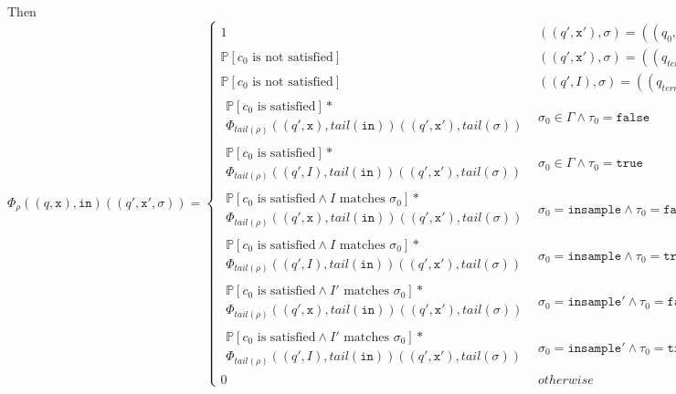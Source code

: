 \documentclass[12pt]{article}
\newcommand{\PP}{\mathbb{P}}
\theoremstyle{definition}
\begin{document}
Then \[
    \Phi_{\rho}((q, \texttt{x}), \texttt{in})((q', \texttt{x}', \sigma)) = \begin{cases}
        1 & ((q', \texttt{x}'), \sigma)=((q_0, \texttt{x}), \lambda)\land n = 0\\
        \PP[c_0\text{ is not satisfied}] & ((q', \texttt{x}'), \sigma) = ((q_{term}, \texttt{x}), \lambda)\land \tau_0 = \texttt{false} \\
        \PP[c_0\text{ is not satisfied}] & ((q', I), \sigma) = ((q_{term}, \texttt{x}), \lambda)\land \tau_0 = \texttt{true}\\
        \begin{gathered}
            \PP[c_0\text{ is satisfied}]*\\
            \Phi_{tail(\rho)}((q',\texttt{x}), tail(\texttt{in}))((q', \texttt{x}'), tail(\sigma))
        \end{gathered} & \sigma_0 \in \Gamma\land \tau_0 = \texttt{false}\\[15pt]
        \begin{gathered}
            \PP[c_0\text{ is satisfied}]*\\
            \Phi_{tail(\rho)}((q',I), tail(\texttt{in}))((q', \texttt{x}'), tail(\sigma))
        \end{gathered} & \sigma_0 \in \Gamma\land\tau_0 = \texttt{true}\\[15pt]
        \begin{gathered}
            \PP[c_0\text{ is satisfied}\land I \text{ matches }\sigma_0]*\\
            \Phi_{tail(\rho)}((q',\texttt{x}), tail(\texttt{in}))((q', \texttt{x}'), tail(\sigma))
        \end{gathered} & \sigma_0 = \texttt{insample}\land \tau_0 = \texttt{false}\\[15pt]
        \begin{gathered}
            \PP[c_0\text{ is satisfied}\land I \text{ matches }\sigma_0]*\\
            \Phi_{tail(\rho)}((q',I), tail(\texttt{in}))((q', \texttt{x}'), tail(\sigma))
        \end{gathered} & \sigma_0 = \texttt{insample}\land\tau_0 = \texttt{true}\\[15pt]
        \begin{gathered}
            \PP[c_0\text{ is satisfied}\land I' \text{ matches }\sigma_0]*\\
            \Phi_{tail(\rho)}((q',\texttt{x}), tail(\texttt{in}))((q', \texttt{x}'), tail(\sigma))
        \end{gathered} & \sigma_0 = \texttt{insample}'\land \tau_0 = \texttt{false}\\[15pt]
        \begin{gathered}
            \PP[c_0\text{ is satisfied}\land I' \text{ matches }\sigma_0]*\\
            \Phi_{tail(\rho)}((q',I), tail(\texttt{in}))((q', \texttt{x}'), tail(\sigma))
        \end{gathered} & \sigma_0 = \texttt{insample}'\land\tau_0 = \texttt{true}\\[15pt]
        0 & otherwise
    \end{cases}.
\]
\end{document}
